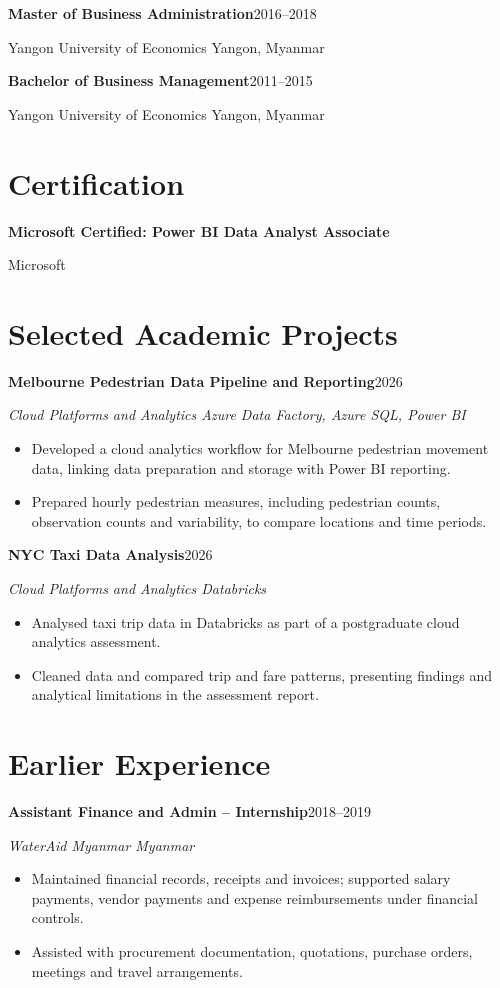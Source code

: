 \documentclass[11pt,a4paper]{article}
\newcommand{\role}[3]{\textbf{#1}\hfill #2\par\textit{#3}\par}
\begin{document}
\vspace{6pt}
\textbf{Master of Business Administration}\hfill 2016--2018\par
Yangon University of Economics \textbar{} Yangon, Myanmar

\vspace{5pt}
\textbf{Bachelor of Business Management}\hfill 2011--2015\par
Yangon University of Economics \textbar{} Yangon, Myanmar

\section{Certification}
\textbf{Microsoft Certified: Power BI Data Analyst Associate}\par
Microsoft

\section{Selected Academic Projects}
\textbf{Melbourne Pedestrian Data Pipeline and Reporting}\hfill 2026\par
\textit{Cloud Platforms and Analytics \textbar{} Azure Data Factory, Azure SQL, Power BI}
\begin{itemize}
\item Developed a cloud analytics workflow for Melbourne pedestrian movement data, linking data preparation and storage with Power BI reporting.
\item Prepared hourly pedestrian measures, including pedestrian counts, observation counts and variability, to compare locations and time periods.
\end{itemize}

\vspace{4pt}
\textbf{NYC Taxi Data Analysis}\hfill 2026\par
\textit{Cloud Platforms and Analytics \textbar{} Databricks}
\begin{itemize}
\item Analysed taxi trip data in Databricks as part of a postgraduate cloud analytics assessment.
\item Cleaned data and compared trip and fare patterns, presenting findings and analytical limitations in the assessment report.
\end{itemize}

\section{Earlier Experience}
\role{Assistant Finance and Admin -- Internship}{2018--2019}{WaterAid Myanmar \textbar{} Myanmar}
\begin{itemize}
\item Maintained financial records, receipts and invoices; supported salary payments, vendor payments and expense reimbursements under financial controls.
\item Assisted with procurement documentation, quotations, purchase orders, meetings and travel arrangements.
\end{itemize}
\end{document}
